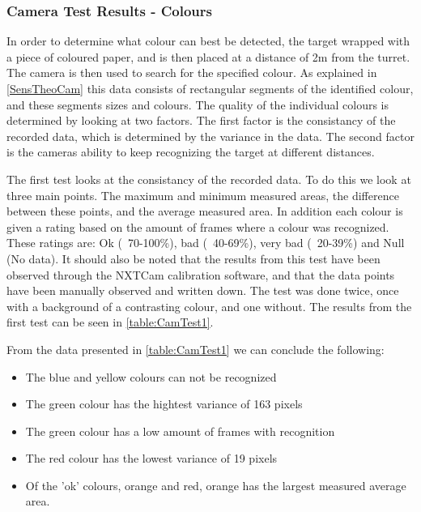
\subsubsection{Camera Test Results - Colours}\label{CamTestColours}
In order to determine what colour can best be detected, the target wrapped with
a piece of coloured paper, and is then placed at a distance of 2m from the
turret. The camera is then used to search for the specified colour. As explained
in \autoref{SensTheoCam} this data consists of rectangular segments of the
identified colour, and these segments sizes and colours. The quality of the
individual colours is determined by looking at two factors. The first factor is
the consistancy of the recorded data, which is determined by the variance in the
data. The second factor is the cameras ability to keep recognizing the target
at different distances.\nl

The first test looks at the consistancy of the recorded data. To do this we look
at three main points. The maximum and minimum measured areas, the difference
between these points, and the average measured area. In addition each colour is
given a rating based on the amount of frames where a colour was recognized.
These ratings are: Ok (~70-100\%), bad (~40-69\%), very bad (~20-39\%) and Null
(No data). It should also be noted that the results from this test have been
observed through the NXTCam calibration software, and that the data points have
been manually observed and written down. The test was done twice, once with a
background of a contrasting colour, and one without. The results from the first
test can be seen in \autoref{table:CamTest1}.



From the data presented in \autoref{table:CamTest1} we can conclude the
following:
\begin{itemize}
  \item The blue and yellow colours can not be recognized
  \item The green colour has the hightest variance of 163 pixels
  \item The green colour has a low amount of frames with recognition
  \item The red colour has the lowest variance of 19 pixels
  \item Of the 'ok' colours, orange and red, orange has the largest measured
  average area.
\end{itemize} 

